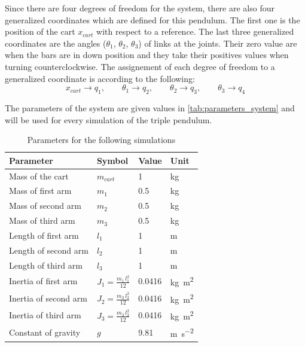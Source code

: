 \documentclass[a4paper,12pt,twoside]{article}
\begin{document}
Since there are four degrees of freedom for the system, there are also four generalized coordinates which are defined for this pendulum. The first one is the position of the cart $x_{cart}$ with respect to a reference. The last three generalized coordinates are the angles ($\theta_1$, $\theta_2$, $\theta_3$) of links at the joints. Their zero value are when the bars are in down position and they take their positives values when turning counterclockwise. The assignement of each degree of freedom to a generalized coordinate is according to the following:
\[
	x_{cart}\to q_1, \qquad \theta_1\to q_2, \qquad \theta_2\to q_3, \qquad \theta_3\to q_4
\]

The parameters of the system are given values in \autoref{tab:parameters_system} and will be used for every simulation of the triple pendulum.
\begin{table}[H]
	\centering
	\caption{Parameters for the following simulations}
	\label{tab:parameters_system}
	\begin{tabular}{@{}llll@{}}
		\toprule
		Parameter             & Symbol                      & Value  & Unit                         \\ \midrule
		Mass of the cart      & $m_{cart}$                  & 1      & kg                           \\
		Mass of first arm     & $m_1$                       & 0.5    & kg                           \\
		Mass of second arm    & $m_2$                       & 0.5    & kg                           \\
		Mass of third arm     & $m_3$                       & 0.5    & kg                           \\
		Length of first arm   & $l_1$                       & 1      & m                            \\
		Length of second arm  & $l_2$                       & 1      & m                            \\
		Length of third arm   & $l_3$                       & 1      & m                            \\
		Inertia of first arm  & $J_1=\frac{m_1\,l_1^2}{12}$ & 0.0416 & \si{\kilo\gram\square\metre} \\
		Inertia of second arm & $J_2=\frac{m_2\,l_2^2}{12}$ & 0.0416 & \si{\kilo\gram\square\metre} \\
		Inertia of third arm  & $J_3=\frac{m_3\,l_3^2}{12}$ & 0.0416 & \si{\kilo\gram\square\metre} \\
		Constant of gravity   & $g$                         & 9.81   & \si{m\per\square\second}     \\ \bottomrule
	\end{tabular}
\end{table}
\end{document}
